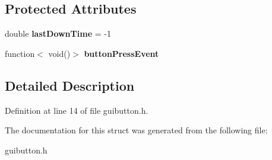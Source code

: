 \subsection*{Protected Attributes}
\begin{DoxyCompactItemize}
\item 
\hypertarget{structGUIButton_a822caa32fd32c2639b72cdbd6dc82c91}{double {\bfseries last\+Down\+Time} = -\/1}\label{structGUIButton_a822caa32fd32c2639b72cdbd6dc82c91}

\item 
\hypertarget{structGUIButton_af8c3e3ff0e3b4ea5daec70e0e583ead5}{function$<$ void()$>$ {\bfseries button\+Press\+Event}}\label{structGUIButton_af8c3e3ff0e3b4ea5daec70e0e583ead5}

\end{DoxyCompactItemize}


\subsection{Detailed Description}


Definition at line 14 of file guibutton.\+h.



The documentation for this struct was generated from the following file\+:\begin{DoxyCompactItemize}
\item 
guibutton.\+h\end{DoxyCompactItemize}
